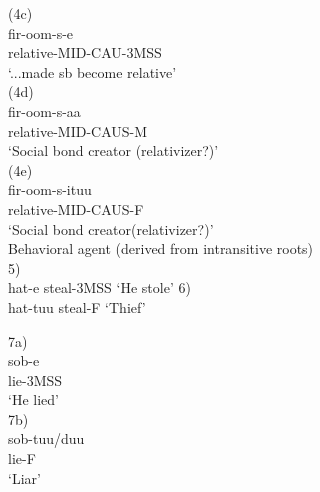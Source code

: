 \documentclass[11pt,a4paper]{article}
\begin{document}
(4c)	\\
\indent fir-oom-s-e\\
\indent relative-MID-CAU-3MSS\\
\indent ‘...made sb become relative’\\

(4d)	\\
\indent fir-oom-s-aa\\
\indent relative-MID-CAUS-M\\
\indent ‘Social bond creator (relativizer?)’\\

(4e)\\
\indent	fir-oom-s-ituu\\
\indent relative-MID-CAUS-F\\
\indent ‘Social bond creator(relativizer?)’\\

Behavioral agent (derived from intransitive roots)\\

5) 	\\
\indent hat-e
\indent steal-3MSS
\indent ‘He stole’
6) 	\\
\indent hat-tuu
\indent steal-F
\indent ‘Thief’

7a) \\
\indent	sob-e\\
\indent lie-3MSS\\
\indent ‘He lied’\\

7b)	\\
\indent sob-tuu/duu \\
\indent lie-F\\
\indent ‘Liar’\\
\end{document}
